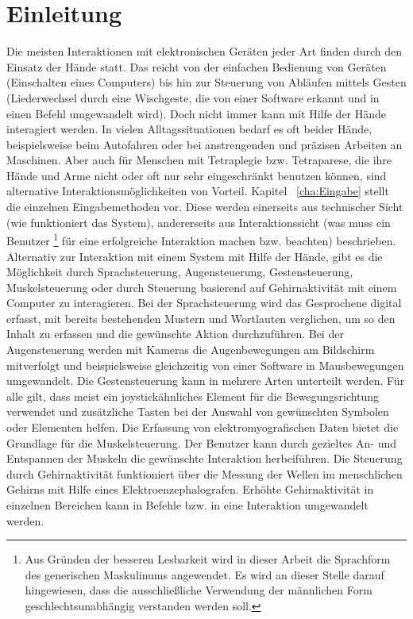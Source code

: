 \chapter{Einleitung}
\label{cha:Einleitung}

Die meisten Interaktionen mit elektronischen Geräten jeder Art finden durch den Einsatz der Hände statt. Das reicht von der einfachen Bedienung von Geräten (\zB Einschalten eines Computers) bis hin zur Steuerung von Abläufen mittels Gesten (\zB Liederwechsel durch eine Wischgeste, die von einer Software erkannt und in einen Befehl umgewandelt wird). Doch nicht immer kann mit Hilfe der Hände interagiert werden. 
In vielen Alltagssituationen bedarf es oft beider Hände, beispielsweise beim Autofahren oder bei anstrengenden und präzisen Arbeiten an Maschinen. Aber auch für Menschen mit Tetraplegie bzw. Tetraparese, die ihre Hände und Arme nicht oder oft nur sehr eingeschränkt benutzen können, sind alternative Interaktionsmöglichkeiten von Vorteil.
\newline \newline
Kapitel ~\ref{cha:Eingabe} stellt die einzelnen Eingabemethoden vor. Diese werden einerseits aus technischer Sicht (wie funktioniert das System), andererseits aus Interaktionssicht (was muss ein Benutzer%
\footnote{Aus Gründen der besseren Lesbarkeit wird in dieser Arbeit die Sprachform des generischen Maskulinums angewendet. Es wird an dieser Stelle darauf hingewiesen, dass die ausschließliche Verwendung der männlichen Form geschlechtsunabhängig verstanden werden soll.}
%
 für eine erfolgreiche Interaktion machen bzw. beachten) beschrieben. Alternativ zur Interaktion mit einem System mit Hilfe der Hände, gibt es die Möglichkeit durch Sprachsteuerung, Augensteuerung, Gestensteuerung, Muskelsteuerung oder durch Steuerung basierend auf Gehirnaktivität mit einem Computer zu interagieren. Bei der Sprachsteuerung wird das Gesprochene digital erfasst, mit bereits bestehenden Mustern und Wortlauten verglichen, um so den Inhalt zu erfassen und die gewünschte Aktion durchzuführen. Bei der Augensteuerung werden mit Kameras die Augenbewegungen am Bildschirm mitverfolgt und beispielsweise gleichzeitig von einer Software in Mausbewegungen umgewandelt. Die Gestensteuerung kann in mehrere Arten unterteilt werden. Für alle gilt, dass meist ein joystickähnliches Element für die Bewegungsrichtung verwendet und zusätzliche Tasten bei der Auswahl von gewünschten Symbolen oder Elementen helfen. Die Erfassung von elektromyografischen Daten bietet die Grundlage für die Muskelsteuerung. Der Benutzer kann durch gezieltes An- und Entspannen der Muskeln die gewünschte Interaktion herbeiführen. Die Steuerung durch Gehirnaktivität funktioniert über die Messung der Wellen im menschlichen Gehirns mit Hilfe eines  Elektroenzephalografen. Erhöhte Gehirnaktivität in einzelnen Bereichen kann in Befehle bzw. in eine Interaktion umgewandelt werden.
